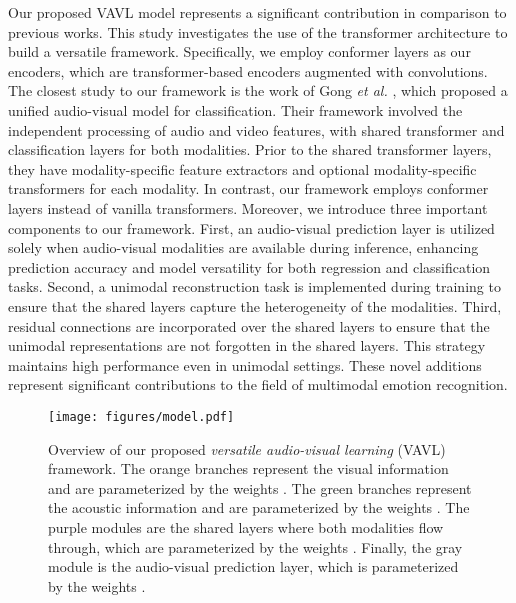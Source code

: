 \documentclass{article}
\def \etal {\textit{et al. }}
\begin{document}
Our proposed VAVL model represents a significant contribution in comparison to previous works. This study investigates the use of the transformer architecture to build a versatile framework. Specifically, we employ conformer layers \cite{gulati_2020} as our encoders, which are transformer-based encoders augmented with convolutions. The closest study to our framework is the work of Gong \etal \cite{gong_2022}, which proposed a unified audio-visual model for classification. Their framework involved the independent processing of audio and video features, with shared transformer and classification layers for both modalities. Prior to the shared transformer layers, they have modality-specific feature extractors and optional modality-specific transformers for each modality. In contrast, our framework employs conformer layers instead of vanilla transformers. Moreover, we introduce three important components to our framework. First, an audio-visual prediction layer is utilized solely when audio-visual modalities are available during inference, enhancing prediction accuracy and model versatility for both regression and classification tasks. Second, a unimodal reconstruction task is implemented during training to ensure that the shared layers capture the heterogeneity of the modalities. Third, residual connections are incorporated over the shared layers to ensure that the unimodal representations are not forgotten in the shared layers. This strategy maintains high performance even in unimodal settings. These novel additions represent significant contributions to the field of multimodal emotion recognition. 
























\begin{figure}[t]
    \centering
    \texttt{[image: figures/model.pdf]}
    \caption{Overview of our proposed \emph{versatile audio-visual learning} (VAVL) framework. The orange branches represent the visual information and are parameterized by the weights . The green branches represent the acoustic information and are parameterized by the weights . The purple modules are the shared layers where both modalities flow through, which are parameterized by the weights . Finally, the gray module is the audio-visual prediction layer, which is parameterized by the weights .}
    \label{fig:model}
\end{figure}
\end{document}
